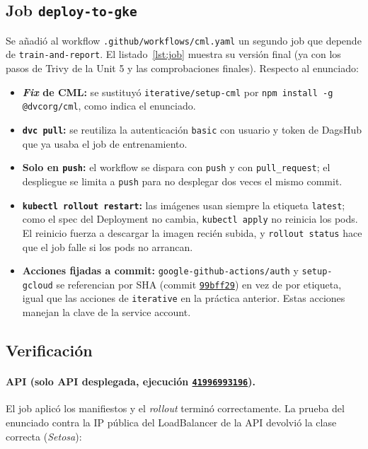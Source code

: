 \documentclass[11pt,a4paper]{article}
\newcommand{\code}[1]{\texttt{#1}}
\newcommand{\run}[1]{\href{https://github.com/JES0406/mlops-practica-icai/actions/runs/#1}{\code{#1}}}
\newcommand{\commit}[1]{\href{https://github.com/JES0406/mlops-practica-icai/commit/#1}{\code{#1}}}
\begin{document}
\subsection{Job \code{deploy-to-gke}}

Se añadió al workflow \code{.github/workflows/cml.yaml} un segundo job que depende de
\code{train-and-report}. El listado~\ref{lst:job} muestra su versión final (ya con los
pasos de Trivy de la Unit 5 y las comprobaciones finales). Respecto al enunciado:

\begin{itemize}[nosep]
  \item \textbf{\emph{Fix} de CML:} se sustituyó \code{iterative/setup-cml} por
    \code{npm install -g @dvcorg/cml}, como indica el enunciado.
  \item \textbf{\code{dvc pull}:} se reutiliza la autenticación \code{basic} con usuario
    y token de DagsHub que ya usaba el job de entrenamiento.
  \item \textbf{Solo en \code{push}:} el workflow se dispara con \code{push} y con
    \code{pull\_request}; el despliegue se limita a \code{push} para no desplegar dos
    veces el mismo commit.
  \item \textbf{\code{kubectl rollout restart}:} las imágenes usan siempre la etiqueta
    \code{latest}; como el spec del Deployment no cambia, \code{kubectl apply} no
    reinicia los pods. El reinicio fuerza a descargar la imagen recién subida, y
    \code{rollout status} hace que el job falle si los pods no arrancan.
  \item \textbf{Acciones fijadas a commit:} \code{google-github-actions/auth} y
    \code{setup-gcloud} se referencian por SHA (commit \commit{99bff29}) en vez de por
    etiqueta, igual que las acciones de \code{iterative} en la práctica anterior. Estas
    acciones manejan la clave de la service account.
\end{itemize}



\subsection{Verificación}

\paragraph{API (solo API desplegada, ejecución \run{41996993196}).}
El job aplicó los manifiestos y el \emph{rollout} terminó correctamente. La prueba del
enunciado contra la IP pública del LoadBalancer de la API devolvió la clase correcta
(\emph{Setosa}):
\end{document}
